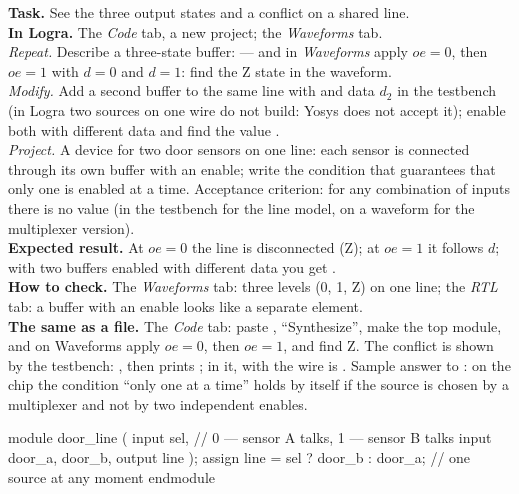 \begin{diybox}
\textbf{Task.} See the three output states and a conflict on a shared line.\\
\textbf{In Logra.} The \emph{Code} tab, a new project; the \emph{Waveforms} tab.\\
 \emph{Repeat.} Describe a three-state buffer:
 --- and in \emph{Waveforms} apply $oe=0$,
then $oe=1$ with $d=0$ and $d=1$: find the Z state in the waveform.\\
 \emph{Modify.} Add a second buffer to the same line with
 and data $d_2$ in the testbench (in Logra two sources on one wire do
not build: Yosys does not accept it); enable both with different data and find the
value .\\
 \emph{Project.} A device for two door sensors on one line:
each sensor is connected through its own buffer with an enable; write the condition
that guarantees that only one is enabled at a time. Acceptance
criterion: for any combination of inputs there is no value  (in the
testbench for the line model, on a waveform for the multiplexer version).\\
\textbf{Expected result.} At $oe=0$ the line is disconnected (Z); at $oe=1$ it
follows $d$; with two buffers enabled with different data you get .\\
\textbf{How to check.} The \emph{Waveforms} tab: three levels (0, 1, Z) on
one line; the \emph{RTL} tab: a buffer with an enable looks like a separate
element.\\
\textbf{The same as a file.} The \emph{Code} tab: paste ,
``Synthesize'', make  the top module, and on Waveforms apply
$oe = 0$, then $oe = 1$, and find Z. The conflict is shown by the testbench:
, then  prints
; in it, with  the wire is . Sample
answer to : on the chip the condition ``only one at a time'' holds by
itself if the source is chosen by a multiplexer and not by two independent
enables.
\end{diybox}

\begin{vcode}
module door_line (
    input  sel,                 // 0 --- sensor A talks, 1 --- sensor B talks
    input  door_a, door_b,
    output line
);
    assign line = sel ? door_b : door_a;   // one source at any moment
endmodule
\end{vcode}


